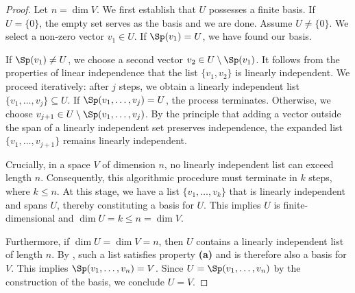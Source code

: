\begin{proof}
Let $n = \dim V$. We first establish that $U$ possesses a finite basis. If $U = \{0\}$, the empty set serves as the basis and we are done. Assume $U \neq \{0\}$. We select a non-zero vector $v_1 \in U$. If $\Sp(v_1) = U$, we have found our basis. 

If $\Sp(v_1) \neq U$, we choose a second vector $v_2 \in U \setminus \Sp(v_1)$. It follows from the properties of linear independence that the list $\{v_1, v_2\}$ is linearly independent. We proceed iteratively: after $j$ steps, we obtain a linearly independent list $\{v_1, \dots, v_j\} \subseteq U$. If $\Sp(v_1, \dots, v_j) = U$, the process terminates. Otherwise, we choose $v_{j+1} \in U \setminus \Sp(v_1, \dots, v_j)$. By the principle that adding a vector outside the span of a linearly independent set preserves independence, the expanded list $\{v_1, \dots, v_{j+1}\}$ remains linearly independent.

Crucially, in a space $V$ of dimension $n$, no linearly independent list can exceed length $n$. Consequently, this algorithmic procedure must terminate in $k$ steps, where $k \le n$. At this stage, we have a list $\{v_1, \dots, v_k\}$ that is linearly independent and spans $U$, thereby constituting a basis for $U$. This implies $U$ is finite-dimensional and $\dim U = k \le n = \dim V$.

Furthermore, if $\dim U = \dim V = n$, then $U$ contains a linearly independent list of length $n$. By , such a list satisfies property \textbf{(a)} and is therefore also a basis for $V$. This implies $\Sp(v_1, \dots, v_n) = V$. Since $U = \Sp(v_1, \dots, v_n)$ by the construction of the basis, we conclude $U = V$.
\end{proof}